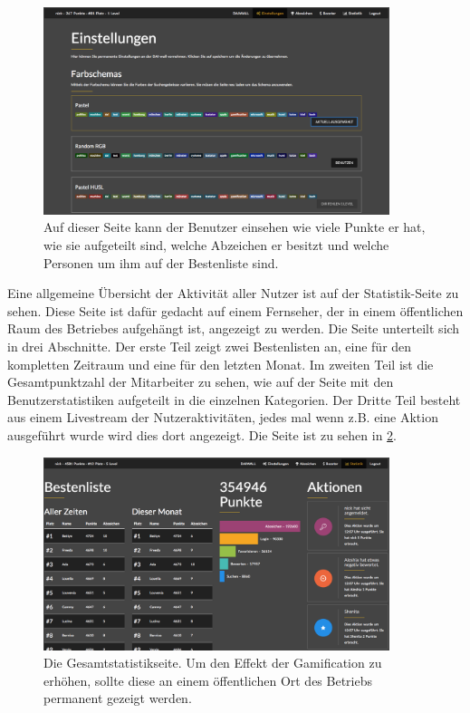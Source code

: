 \documentclass[12pt,twoside]{book}
\begin{document}
\begin{figure}[H]
    \centering
    \includegraphics[width=0.9\textwidth]{images/infoboard_settings.png}
    \caption{Auf dieser Seite kann der Benutzer einsehen wie viele Punkte er hat, wie sie aufgeteilt sind, welche Abzeichen er besitzt und welche Personen um ihm auf der Bestenliste sind.}
    \label{fig:settings}
\end{figure}

Eine allgemeine Übersicht der Aktivität aller Nutzer ist auf der Statistik-Seite zu sehen. Diese Seite ist dafür gedacht auf einem Fernseher, der in einem öffentlichen Raum des Betriebes aufgehängt ist, angezeigt zu werden. Die Seite unterteilt sich in drei Abschnitte. Der erste Teil zeigt zwei Bestenlisten an, eine für den kompletten Zeitraum und eine für den letzten Monat. Im zweiten Teil ist die Gesamtpunktzahl der Mitarbeiter zu sehen, wie auf der Seite mit den Benutzerstatistiken aufgeteilt in die einzelnen Kategorien. Der Dritte Teil besteht aus einem Livestream der Nutzeraktivitäten, jedes mal wenn z.B. eine Aktion ausgeführt wurde wird dies dort angezeigt. Die Seite ist zu sehen in \ref{fig:stats}.


\begin{figure}[H]
    \centering
    \includegraphics[width=0.9\textwidth]{images/infoboard_stats.png}
    \caption{Die Gesamtstatistikseite. Um den Effekt der Gamification zu erhöhen, sollte diese an einem öffentlichen Ort des Betriebs permanent gezeigt werden.}
    \label{fig:stats}
\end{figure}
\end{document}
